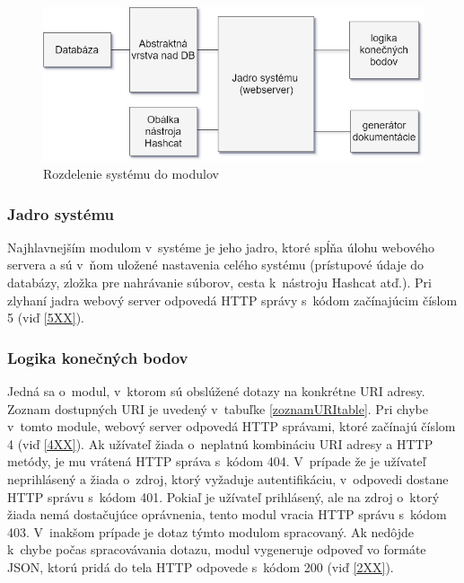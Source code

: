 \documentclass[slovak,cprint]{fitthesis} %
\begin{document}
\begin{figure}[h]
    \label{fig:moduly}
    \centering
    \includegraphics[scale=0.6]{obrazky/moduly.png}
    \caption{Rozdelenie systému do modulov}
\end{figure}

\subsubsection{Jadro systému}
Najhlavnejším modulom v~systéme je jeho jadro, ktoré spĺňa úlohu webového servera a sú v~ňom uložené nastavenia celého systému (prístupové údaje do databázy, zložka pre nahrávanie súborov, cesta k~nástroju Hashcat atď.). Pri zlyhaní jadra webový server odpovedá HTTP správy s~kódom začínajúcim číslom 5 (viď \ref{5XX}).


\subsubsection{Logika konečných bodov}
Jedná sa o~modul, v~ktorom sú obslúžené dotazy na konkrétne URI adresy. Zoznam dostupných URI je uvedený v~tabuľke \ref{zoznamURItable}. Pri chybe v~tomto module, webový server odpovedá HTTP správami, ktoré začínajú číslom 4 (viď \ref{4XX}). Ak užívateľ žiada o~neplatnú kombináciu URI adresy a HTTP metódy, je mu vrátená HTTP správa s~kódom 404. V~prípade že je užívateľ neprihlásený a žiada o~zdroj, ktorý vyžaduje autentifikáciu, v~odpovedi dostane HTTP správu s~kódom 401. Pokiaľ je užívateľ prihlásený, ale na zdroj o~ktorý žiada nemá dostačujúce oprávnenia, tento modul vracia HTTP správu s~kódom 403. V~inakšom prípade je dotaz týmto modulom spracovaný. Ak nedôjde k~chybe počas spracovávania dotazu, modul vygeneruje odpoveď vo formáte JSON, ktorú pridá do tela HTTP odpovede s~kódom 200 (viď \ref{2XX}).
\end{document}
